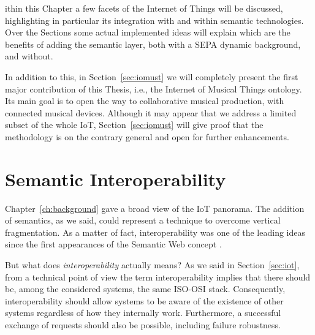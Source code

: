 ithin this Chapter a few facets of the Internet of Things will be discussed, highlighting in particular its integration with and within semantic technologies. Over the Sections some actual implemented ideas will explain which are the benefits of adding the semantic layer, both with a SEPA dynamic background, and without.

In addition to this, in Section~\ref{sec:iomust} we will completely present the first major contribution of this Thesis, i.e., the Internet of Musical Things ontology. Its main goal is to open the way to collaborative musical production, with connected musical devices. Although it may appear that we address a limited subset of the whole IoT, Section~\ref{sec:iomust} will give proof that the methodology is on the contrary general and open for further enhancements.


%

\section{Semantic Interoperability}
\label{sec:21_rw}

Chapter~\ref{ch:background} gave a broad view of the IoT panorama. The addition of semantics, as we said, could represent a technique to overcome vertical fragmentation. As a matter of fact, interoperability was one of the leading ideas since the first appearances of the Semantic Web concept \cite{berners2001semantic}.

But what does \textit{interoperability} actually means? As we said in Section~\ref{sec:iot}, from a technical point of view the term interoperability implies that there should be, among the considered systems, the same ISO-OSI stack. Consequently, interoperability should allow systems to be aware of the existence of other systems regardless of how they internally work. Furthermore, a successful exchange of requests should also be possible, including failure robustness.

